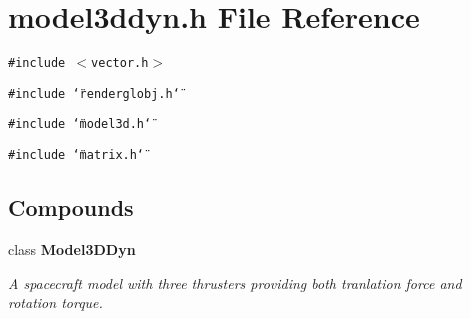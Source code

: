 \section{model3ddyn.h File Reference}
\label{model3ddyn_8h}
{\tt \#include $<$vector.h$>$}\par
{\tt \#include \char`\"{}renderglobj.h\char`\"{}}\par
{\tt \#include \char`\"{}model3d.h\char`\"{}}\par
{\tt \#include \char`\"{}matrix.h\char`\"{}}\par
\subsection*{Compounds}
\begin{CompactItemize}
\item 
class {\bf Model3DDyn}
\begin{CompactList}\small\item\em A spacecraft model with three thrusters providing both tranlation force and rotation torque.\item\end{CompactList}\end{CompactItemize}
